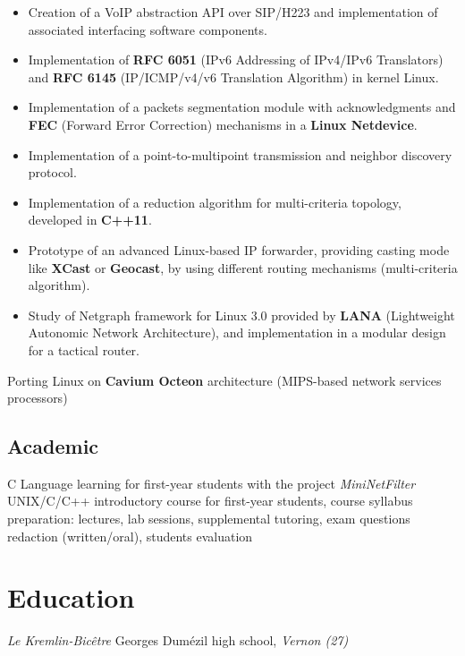 \documentclass[11pt, a4paper]{moderncv}
\begin{document}
{
	\begin{itemize}
		\renewcommand{\labelitemi}{$\bullet$  }
		\item Creation of a VoIP abstraction API over SIP/H223 and implementation of associated interfacing software
			components.
		\item Implementation of \textbf{RFC 6051} (IPv6 Addressing of IPv4/IPv6 Translators) and \textbf{RFC 6145} (IP/ICMP/v4/v6
			Translation Algorithm) in kernel Linux.
		\item Implementation of a packets segmentation module with acknowledgments and \textbf{FEC} (Forward Error Correction)
			mechanisms in a \textbf{Linux Netdevice}.
		\item Implementation of a point-to-multipoint transmission and neighbor discovery protocol.
		\item Implementation of a reduction algorithm for multi-criteria topology, developed in \textbf{C++11}.
		\item Prototype of an advanced Linux-based IP forwarder, providing casting mode like \textbf{XCast} or \textbf{Geocast},
			by using different routing mechanisms (multi-criteria algorithm).
		\item Study of Netgraph framework for Linux 3.0 provided by \textbf{LANA} (Lightweight Autonomic Network Architecture),
			and implementation in a modular design for a tactical router.
	\end{itemize}
}
{
	Porting Linux on \textbf{Cavium Octeon} architecture (MIPS-based network services processors)
}

\subsection{Academic}
		{C Language learning for first-year students with the project \textit{MiniNetFilter}}
		{UNIX/C/C++ introductory course for first-year students, course syllabus preparation: lectures, lab sessions,
			supplemental tutoring, exam questions redaction (written/oral), students evaluation}

\newpage
\section{Education}
			{\textit{Le Kremlin-Bic\^etre}}{}{}
			{Georges Dumézil high school, \textit{Vernon (27)}}{}{}
\end{document}
